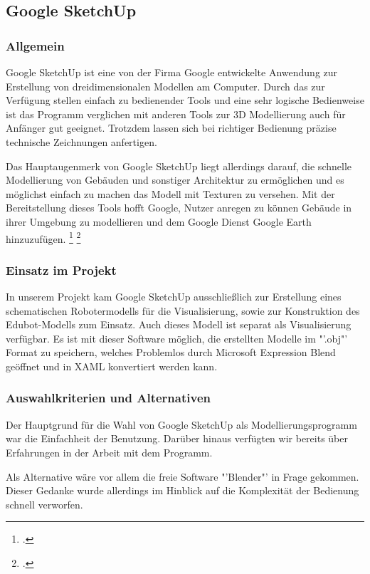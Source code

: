 \subsection{Google SketchUp}
\subsubsection{Allgemein}
Google SketchUp ist eine von der Firma Google entwickelte Anwendung zur Erstellung von dreidimensionalen Modellen am Computer. Durch das zur Verfügung stellen einfach zu bedienender Tools und eine sehr logische Bedienweise ist das Programm verglichen mit anderen Tools zur 3D Modellierung auch für Anfänger gut geeignet. Trotzdem lassen sich bei richtiger Bedienung präzise technische Zeichnungen anfertigen.

Das Hauptaugenmerk von Google SketchUp liegt allerdings darauf, die schnelle Modellierung von Gebäuden und sonstiger Architektur zu ermöglichen und es möglichst einfach zu machen das Modell mit Texturen zu versehen. Mit der Bereitstellung dieses Tools hofft Google, Nutzer anregen zu können Gebäude in ihrer Umgebung zu modellieren und dem Google Dienst Google Earth hinzuzufügen. \footcite[vgl.][]{sketchupchip} \footcite[vgl.][]{sketchupwiki}

\subsubsection{Einsatz im Projekt}
In unserem Projekt kam Google SketchUp ausschließlich zur Erstellung eines schematischen Robotermodells für die Visualisierung, sowie zur Konstruktion des Edubot-Modells zum Einsatz. Auch dieses Modell ist separat als Visualisierung verfügbar. 
Es ist mit dieser Software möglich, die erstellten Modelle im "'.obj"' Format zu speichern, welches Problemlos durch Microsoft Expression Blend geöffnet und in XAML konvertiert werden kann. 

\subsubsection{Auswahlkriterien und Alternativen}
Der Hauptgrund für die Wahl von Google SketchUp als Modellierungsprogramm war die Einfachheit der Benutzung. Darüber hinaus verfügten wir bereits über Erfahrungen in der Arbeit mit dem Programm.

Als Alternative wäre vor allem die freie Software "'Blender"' in Frage gekommen. Dieser Gedanke wurde allerdings im Hinblick auf die Komplexität der Bedienung schnell verworfen.
 
